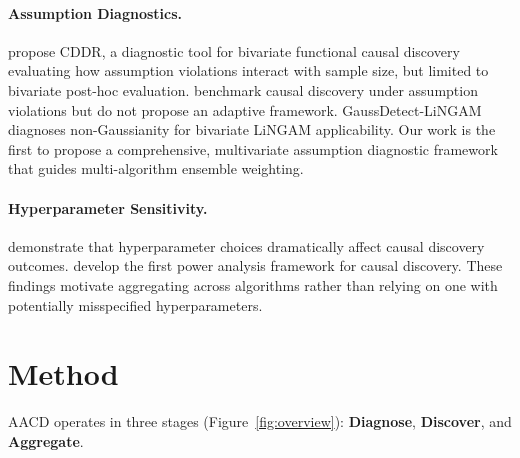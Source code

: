 \documentclass{article}
\newcommand{\aacd}{\textsc{AACD}}
\begin{document}
\paragraph{Assumption Diagnostics.}
\citet{prakash2024diagnostic} propose CDDR, a diagnostic tool for bivariate functional causal discovery evaluating how assumption violations interact with sample size, but limited to bivariate post-hoc evaluation. \citet{montagna2023assumption} benchmark causal discovery under assumption violations but do not propose an adaptive framework. GaussDetect-LiNGAM~\citep{ding2025gaussdetect} diagnoses non-Gaussianity for bivariate LiNGAM applicability. Our work is the first to propose a comprehensive, multivariate assumption diagnostic framework that guides multi-algorithm ensemble weighting.

\paragraph{Hyperparameter Sensitivity.}
\citet{constantinou2024hyperparameters} demonstrate that hyperparameter choices dramatically affect causal discovery outcomes. \citet{kummerfeld2024power} develop the first power analysis framework for causal discovery. These findings motivate aggregating across algorithms rather than relying on one with potentially misspecified hyperparameters.

\section{Method}
\label{sec:method}

\aacd{} operates in three stages (Figure~\ref{fig:overview}): \textbf{Diagnose}, \textbf{Discover}, and \textbf{Aggregate}.
\end{document}
